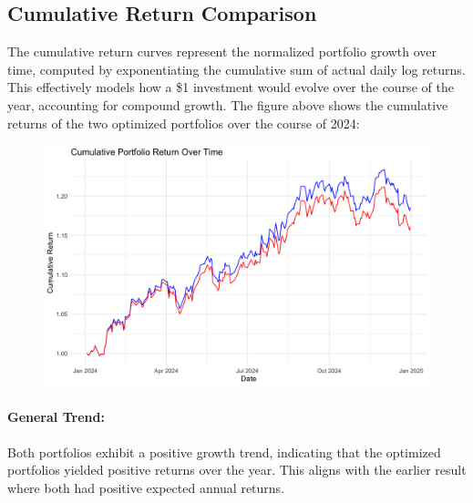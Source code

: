 \documentclass[11pt]{article}
\begin{document}
\subsection*{Cumulative Return Comparison}
The cumulative return curves represent the normalized portfolio growth over time, computed by exponentiating the cumulative sum of actual daily log returns. This effectively models how a \$1 investment would evolve over the course of the year, accounting for compound growth.
The figure above shows the cumulative returns of the two optimized portfolios over the course of 2024:
\begin{figure}[H]
    \centering
    \begin{minipage}{0.55\linewidth}
        \includegraphics[width=\linewidth]{Findings_Yutong/cumulative_return.png}
    \end{minipage}%
    \hfill
    \begin{minipage}{0.4\linewidth}
        \label{cum-return}
    \end{minipage}
\end{figure}
     \paragraph{General Trend:} Both portfolios exhibit a positive growth trend, indicating that the optimized portfolios yielded positive returns over the year. This aligns with the earlier result where both had positive expected annual returns.
\end{document}
